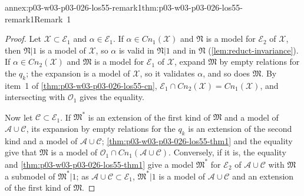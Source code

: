 \begin{annexitem}{annex:p03-w03-p03-026-los55-remark1}{thm:p03-w03-p03-026-los55-remark1}{Remark~1}
\begin{proof}
Let \(\mathcal X\subset\mathcal E_1\) and \(\alpha\in\mathcal E_1\).  If
\(\alpha\in\mathit{Cn}_1(\mathcal X)\) and \(\mathfrak N\) is a model for
\(\mathcal E_2\) of \(\mathcal X\), then \(\mathfrak N|1\) is a model of
\(\mathcal X\), so \(\alpha\) is valid in \(\mathfrak N|1\) and in
\(\mathfrak N\) (\cref{lem:reduct-invariance}).  If
\(\alpha\in\mathit{Cn}_2(\mathcal X)\) and \(\mathfrak M\) is a model for
\(\mathcal E_1\) of \(\mathcal X\), expand \(\mathfrak M\) by empty relations
for the \(q_k\); the expansion is a model of \(\mathcal X\), so it validates
\(\alpha\), and so does \(\mathfrak M\).  By item~1 of
\cref{thm:p03-w03-p03-026-los55-cn},
\(\mathcal E_1\cap\mathit{Cn}_2(\mathcal X)=\mathit{Cn}_1(\mathcal X)\), and
intersecting with \(\mathcal O_1\) gives the equality.

Now let \(\mathcal C\subset\mathcal E_1\).  If \(\mathfrak M^*\) is an
extension of the first kind of \(\mathfrak M\) and a model of
\(\mathcal A\cup\mathcal C\), its expansion by empty relations for the
\(q_k\) is an extension of the second kind and a model of
\(\mathcal A\cup\mathcal C\); \cref{thm:p03-w03-p03-026-los55-thm1} and the
equality give that \(\mathfrak M\) is a model of
\(\mathcal O_1\cap\mathit{Cn}_1(\mathcal A\cup\mathcal C)\).  Conversely, if
it is, the equality and \cref{thm:p03-w03-p03-026-los55-thm1} give a model
\(\mathfrak M^*\) for \(\mathcal E_2\) of \(\mathcal A\cup\mathcal C\) with
\(\mathfrak M\) a submodel of \(\mathfrak M^*|1\); as
\(\mathcal A\cup\mathcal C\subset\mathcal E_1\), \(\mathfrak M^*|1\) is a model
of \(\mathcal A\cup\mathcal C\) and an extension of the first kind of
\(\mathfrak M\).
\end{proof}
\end{annexitem}

